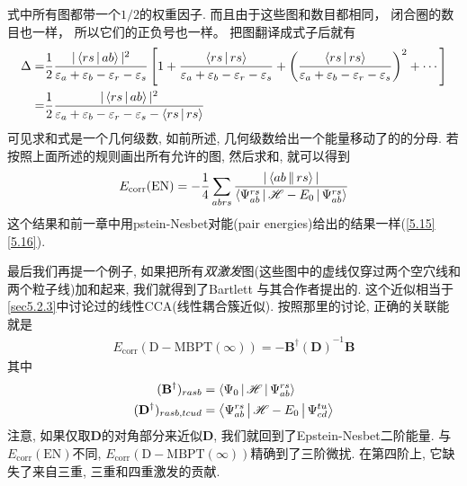 式中所有图都带一个$1/2$的权重因子. 
而且由于这些图和数目都相同，
闭合圈的数目也一样，
所以它们的正负号也一样。
把图翻译成式子后就有
\begin{align*}
\Delta =& \frac{1}{2}\frac{|\Braket{rs|ab}|^2}{\varepsilon_{a}+\varepsilon_{b}-\varepsilon_{r}-\varepsilon_{s}}\left[ 1+ \frac{\Braket{rs|rs}}{\varepsilon_{a}+\varepsilon_{b}-\varepsilon_{r}-\varepsilon_{s}}+ \left( \frac{\Braket{rs|rs}}{\varepsilon_{a}+\varepsilon_{b}-\varepsilon_{r}-\varepsilon_{s}}\right)^2 + \cdots \right]\\
=& \frac{1}{2}\frac{|\Braket{rs|ab}|^2}{\varepsilon_{a}+\varepsilon_{b}-\varepsilon_{r}-\varepsilon_{s} - \Braket{rs|rs}}
\end{align*}
可见求和式是一个几何级数, 
如前所述, 
几何级数给出一个能量移动了的的分母. 
若按照上面所述的规则画出所有允许的图, 
然后求和, 
就可以得到
\begin{align}
E_\mathrm{corr}(\mathrm{EN}) = -\frac{1}{4}\sum_{abrs}\frac{|\Braket{ab||rs}|}{\Braket{\Psi_{ab}^{rs}|\mathscr{H}-E_0|\Psi_{ab}^{rs}}}
\end{align}
这个结果和前一章中用pstein-Nesbet对能(pair energies)给出的结果一样(\ref{5.15}\ref{5.16}).


最后我们再提一个例子, 
如果把所有\emph{双激发}图(这些图中的虚线仅穿过两个空穴线和两个粒子线)加和起来, 
我们就得到了Bartlett
与其合作者提出的. 
这个近似相当于\ref{sec5.2.3}中讨论过的线性CCA(线性耦合簇近似). 
按照那里的讨论, 
正确的关联能就是
\begin{align}
E_\mathrm{corr}(\mathrm{D-MBPT}(\infty)) = -\mathbf{B^\dagger(D)}^{-1}\mathbf{B}
\end{align}
其中
\begin{subequations}
\begin{align}
(\mathbf{B}^\dagger)_{rasb} &= \Braket{\Psi_0|\mathscr{H}|\Psi_{ab}^{rs}}\\
(\mathbf{D}^\dagger)_{rasb,tcud} &= \Braket{\Psi_{ab}^{rs}|\mathscr{H}-E_0|\Psi_{cd}^{tu}}
\end{align}
\end{subequations}
注意, 
如果仅取$\mathbf{D}$的对角部分来近似$\mathbf{D}$, 
我们就回到了Epstein-Nesbet二阶能量. 
与$E_\mathrm{corr}(\mathrm{EN})$不同, 
$E_\mathrm{corr}(\mathrm{D-MBPT}(\infty))$精确到了三阶微扰. 
在第四阶上, 
它缺失了来自三重, 
三重和四重激发的贡献.

